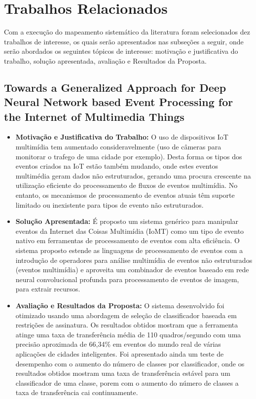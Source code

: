 \documentclass[tid,table]{texufpel} %
\begin{document}
\section{Trabalhos Relacionados}
Com a execução do mapeamento sistemático da literatura
foram selecionados dez trabalhos de interesse, os quais serão apresentados nas subseções a seguir, onde serão abordados os seguintes tópicos de interesse: motivação e justificativa do trabalho, solução apresentada, avaliação e Resultados da Proposta.


\subsection{Towards a Generalized Approach for Deep Neural Network based Event Processing for the Internet of Multimedia Things}


\begin{itemize}
	\item \textbf{Motivação e Justificativa do Trabalho:} O uso de dispositivos IoT multimídia tem aumentado consideravelmente (uso de câmeras para monitorar o trafego de uma cidade por exemplo). Desta forma os tipos dos eventos criados na IoT estão também mudando, onde estes eventos multimédia geram dados não estruturados, gerando uma procura crescente na utilização eficiente do processamento de fluxos de eventos multimídia. No entanto, os mecanismos de processamento de eventos atuais têm suporte limitado ou inexistente para tipos de evento não estruturados.
	
	\item \textbf{Solução Apresentada:} É proposto um sistema genérico para manipular eventos da Internet das Coisas Multimídia (IoMT) como um tipo de evento nativo em ferramentas de processamento de eventos com alta eficiência. O sistema proposto estende as linguagens de processamento de eventos com a introdução de operadores para análise multimídia de eventos não estruturados (eventos multimídia) e aproveita um combinador de eventos baseado em rede neural convolucional profunda para processamento de eventos de imagem, para extrair recursos.
	
	\item \textbf{Avaliação e Resultados da Proposta:} O sistema desenvolvido foi otimizado usando uma abordagem de seleção de classificador baseada em restrições de assinatura. Os resultados obtidos mostram que a ferramenta atinge uma taxa de transferência média de 110 quadros/segundo com uma precisão aproximada de 66,34\% em eventos do mundo real de várias aplicações de cidades inteligentes. Foi apresentado ainda um teste de desempenho com o aumento do número de classes por classificador, onde os resultados obtidos mostram uma taxa de transferência estável para um classificador de uma classe, porem com o aumento do número de classes a taxa de transferência cai continuamente.  
	
\end{itemize}
\end{document}

